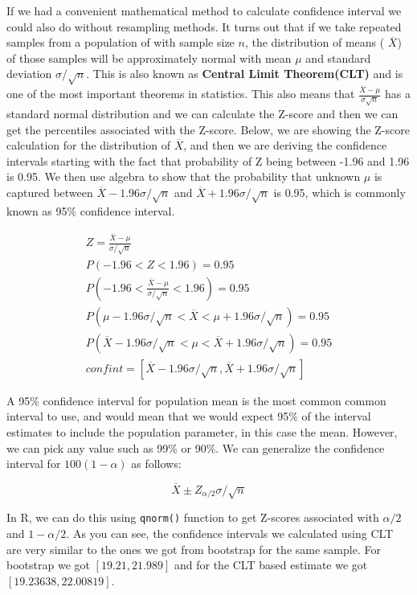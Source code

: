 \documentclass[12pt,]{krantz}
\begin{document}
If we had a convenient mathematical method to calculate confidence interval
we could also do without resampling methods. It turns out that if we take
repeated
samples from a population of with sample size \(n\), the distribution of means
( \(\overline{X}\)) of those samples
will be approximately normal with mean \(\mu\) and standard deviation
\(\sigma/\sqrt{n}\). This is also known as \textbf{Central Limit Theorem(CLT)} and
is one of the most important theorems in statistics. This also means that
\(\frac{\overline{X}-\mu}{\sigma\sqrt{n}}\) has a standard normal
distribution and we can calculate the Z-score and then we can get
the percentiles associated with the Z-score. Below, we are showing the
Z-score
calculation for the distribution of \(\overline{X}\), and then
we are deriving the confidence intervals starting with the fact that
probability of Z being between -1.96 and 1.96 is 0.95. We then use algebra
to show that the probability that unknown \(\mu\) is captured between
\(\overline{X}-1.96\sigma/\sqrt{n}\) and \(\overline{X}+1.96\sigma/\sqrt{n}\) is 0.95, which is commonly known as 95\% confidence interval.

\[\begin{array}{ccc}
Z=\frac{\overline{X}-\mu}{\sigma/\sqrt{n}}\\
P(-1.96 < Z < 1.96)=0.95 \\
P(-1.96 < \frac{\overline{X}-\mu}{\sigma/\sqrt{n}} < 1.96)=0.95\\
P(\mu-1.96\sigma/\sqrt{n} < \overline{X} < \mu+1.96\sigma/\sqrt{n})=0.95\\
P(\overline{X}-1.96\sigma/\sqrt{n} < \mu < \overline{X}+1.96\sigma/\sqrt{n})=0.95\\
confint=[\overline{X}-1.96\sigma/\sqrt{n},\overline{X}+1.96\sigma/\sqrt{n}]
\end{array}\]

A 95\% confidence interval for population mean is the most common
common interval to use, and would
mean that we would expect 95\% of the interval estimates to include the
population parameter, in this case the mean. However, we can pick any value
such as 99\% or 90\%. We can generalize the confidence interval for
\(100(1-\alpha)\) as follows:

\[\overline{X} \pm Z_{\alpha/2}\sigma/\sqrt{n}\]

In R, we can do this using \texttt{qnorm()} function to get Z-scores associated
with \({\alpha/2}\) and \({1-\alpha/2}\). As you can see, the confidence intervals we calculated using CLT are very
similar to the ones we got from bootstrap for the same sample. For bootstrap we got \([19.21, 21.989]\) and for the CLT based estimate we got \([19.23638, 22.00819]\).
\end{document}
